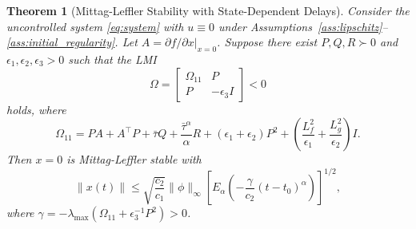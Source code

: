 \documentclass[12pt,a4paper]{article}
\newtheorem{theorem}{Theorem}
\begin{document}
\begin{theorem}[Mittag-Leffler Stability with State-Dependent Delays]
\label{thm:stability_main}
Consider the uncontrolled system \eqref{eq:system} with $u \equiv 0$ under Assumptions~\ref{ass:lipschitz}--\ref{ass:initial_regularity}. Let $A = \partial f / \partial x |_{x=0}$. Suppose there exist $P, Q, R \succ 0$ and $\epsilon_1, \epsilon_2, \epsilon_3 > 0$ such that the LMI
\begin{equation}
\label{eq:lmi_condition}
\Omega = \begin{bmatrix} \Omega_{11} & P \\ P & -\epsilon_3 I \end{bmatrix} < 0
\end{equation}
holds, where
\begin{equation}
\label{eq:omega11}
\Omega_{11} = PA + A^{\!\top}\! P + \bar{\tau} Q + \frac{\bar{\tau}^{\alpha}}{\alpha} R + (\epsilon_1 + \epsilon_2) P^2 + \left( \frac{L_f^2}{\epsilon_1} + \frac{L_g^2}{\epsilon_2} \right) I.
\end{equation}
Then $x = 0$ is Mittag-Leffler stable with
\begin{equation}
\label{eq:ml_bound}
\|x(t)\| \leq \sqrt{\frac{c_2}{c_1}} \|\phi\|_{\infty} \left[ E_{\alpha}\!\left( -\frac{\gamma}{c_2}(t-t_0)^{\alpha} \right) \right]^{1/2},
\end{equation}
where $\gamma = -\lambda_{\max}(\Omega_{11} + \epsilon_3^{-1} P^2) > 0$.
\end{theorem}
\end{document}
